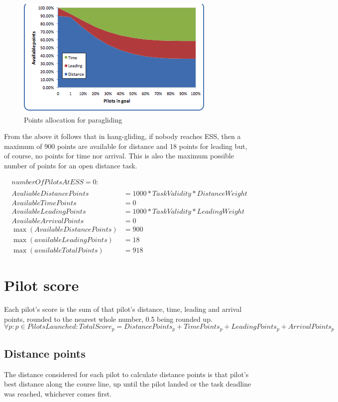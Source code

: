 \documentclass{article}
\begin{document}
\begin{figure}[h]
    \centering
    \includegraphics[scale=0.8]{img/points-allocation-pg.png}
    \caption{Points allocation for paragliding}
\end{figure}

\begin{hg}
From the above it follows that in hang-gliding, if nobody reaches ESS, then
a maximum of 900 points are available for distance and 18 points for leading
but, of course, no points for time nor arrival. This is also the maximum
possible number of points for an open distance task.
\end{hg}

\begin{align*}
    numberOfPilotsAtESS = 0 : \\
    \\
    AvaliableDistancePoints &= 1000 * TaskValidity * DistanceWeight \\
    AvailableTimePoints &= 0 \\
    AvailableLeadingPoints &= 1000 * TaskValidity * LeadingWeight \\
    AvailableArrivalPoints &= 0 \\
    \max(AvailableDistancePoints) &= 900 \\ 
    \max(availableLeadingPoints) &= 18 \\
    \max(availableTotalPoints) &= 918
\end{align*}

\newpage
\section{Pilot score}
\label{sec:pilot-score}
Each pilot’s score is the sum of that pilot’s distance, time, leading and
arrival points, rounded to the nearest whole number, 0.5 being rounded up.
\[ \forall p : p \in PilotsLaunched : TotalScore_p = DistancePoints_p + TimePoints_p + LeadingPoints_p + ArrivalPoints_p \]
\subsection{Distance points}
\label{sec:distance-points}
The distance considered for each pilot to calculate distance points is that
pilot’s best distance along the course line, up until the pilot landed or the
task deadline was reached, whichever comes first.
\end{document}
